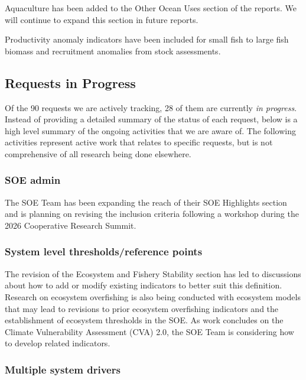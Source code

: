 \documentclass[
  10pt,
]{article}
\begin{document}
Aquaculture has been added to the Other Ocean Uses section of the
reports. We will continue to expand this section in future reports.

Productivity anomaly indicators have been included for small fish to
large fish biomass and recruitment anomalies from stock assessments.

\subsection{Requests in Progress}\label{requests-in-progress}

Of the 90 requests we are actively tracking, 28 of them are currently
\emph{in progress}. Instead of providing a detailed summary of the
status of each request, below is a high level summary of the ongoing
activities that we are aware of. The following activities represent
active work that relates to specific requests, but is not comprehensive
of all research being done elsewhere.

\subsubsection{SOE admin}\label{soe-admin-2}

The SOE Team has been expanding the reach of their SOE Highlights
section and is planning on revising the inclusion criteria following a
workshop during the 2026 Cooperative Research Summit.

\subsubsection{System level thresholds/reference
points}\label{system-level-thresholdsreference-points-2}

The revision of the Ecosystem and Fishery Stability section has led to
discussions about how to add or modify existing indicators to better
suit this definition. Research on ecosystem overfishing is also being
conducted with ecosystem models that may lead to revisions to prior
ecosystem overfishing indicators and the establishment of ecosystem
thresholds in the SOE. As work concludes on the Climate Vulnerability
Assessment (CVA) 2.0, the SOE Team is considering how to develop related
indicators.

\subsubsection{Multiple system drivers}\label{multiple-system-drivers-2}
\end{document}
